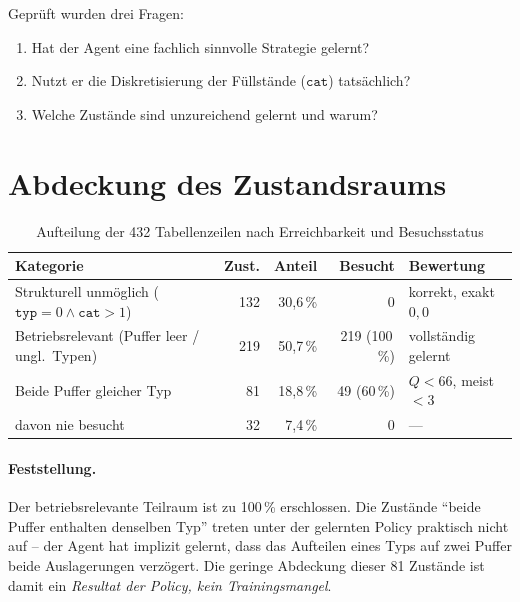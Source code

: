 \documentclass[11pt,a4paper]{article}
\newcommand{\cat}{\texttt{cat}}
\newcommand{\typ}{\texttt{typ}}
\begin{document}
Geprüft wurden drei Fragen:
\begin{enumerate}[label=\arabic*.,leftmargin=*]
  \item Hat der Agent eine fachlich sinnvolle Strategie gelernt?
  \item Nutzt er die Diskretisierung der Füllstände ($\cat$) tatsächlich?
  \item Welche Zustände sind unzureichend gelernt und warum?
\end{enumerate}

\section{Abdeckung des Zustandsraums}

\begin{table}[htbp]
\centering
\caption{Aufteilung der 432 Tabellenzeilen nach Erreichbarkeit und Besuchsstatus}
\begin{tabularx}{\textwidth}{@{}Xrrrl@{}}
\toprule
\textbf{Kategorie} & \textbf{Zust.} & \textbf{Anteil} &
\textbf{Besucht} & \textbf{Bewertung} \\
\midrule
Strukturell unmöglich ($\typ=0 \wedge \cat>1$) & 132 & 30{,}6\,\% & 0
  & korrekt, exakt $0{,}0$ \\
Betriebsrelevant (Puffer leer / ungl.\ Typen)   & 219 & 50{,}7\,\% & 219 (100\,\%)
  & vollständig gelernt \\
Beide Puffer gleicher Typ                       &  81 & 18{,}8\,\% & 49 (60\,\%)
  & $Q<66$, meist $<3$ \\
\quad davon nie besucht                         &  32 &  7{,}4\,\% & 0
  & --- \\
\bottomrule
\end{tabularx}
\end{table}

\paragraph{Feststellung.}
Der betriebsrelevante Teilraum ist zu 100\,\% erschlossen. Die Zustände
\enquote{beide Puffer enthalten denselben Typ} treten unter der gelernten Policy
praktisch nicht auf -- der Agent hat implizit gelernt, dass das Aufteilen eines
Typs auf zwei Puffer beide Auslagerungen verzögert. Die geringe Abdeckung dieser
81 Zustände ist damit ein \emph{Resultat der Policy, kein Trainingsmangel}.

\end{document}
